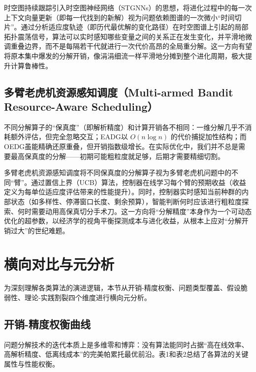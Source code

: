 时空图持续跟踪引入时空图神经网络（STGNNs）的思想，将进化过程中的每一次上下文向量更新（即每一代找到的新解）视为问题依赖图谱的一次微小“时间切片”。通过分析适应度轨迹（即历代最优解的变化路径）在时空图谱上引起的局部拓扑震荡信号，算法可以实时感知哪些变量之间的关系正在发生变化，并平滑地微调重叠边界，而不是每隔若干代就进行一次代价高昂的全局重分解。这一方向有望将原本集中爆发的分解开销，像涓涓细流一样平滑地分摊到整个进化周期，极大提升计算鲁棒性。

\subsection{多臂老虎机资源感知调度（Multi-armed Bandit Resource-Aware Scheduling）}
不同分解算子的“保真度”（即解析精度）和计算开销各不相同：一维分解几乎不消耗额外评估，但完全忽略交互；EADG以 $O(n \log n)$ 的代价捕捉加性结构；而OEDG虽能精确还原重叠，但开销指数级增长。在实际优化中，我们并不总是需要最高保真度的分解——初期可能粗粒度就足够，后期才需要精细切割。

多臂老虎机资源感知调度将不同保真度的分解算子视为多臂老虎机问题中的不同“臂”。通过置信上界（UCB）算法，控制器在线学习每个臂的预期收益（收益定义为每单位适应度评估带来的性能提升）。同时，控制器实时感知当前种群的内部状态（如多样性、停滞窗口长度、剩余预算），智能判断何时应该进行粗粒度探索、何时需要动用高保真切分手术刀。这一方向将“分解精度”本身作为一个可动态优化的超参数，以经济学的视角平衡探测成本与进化收益，从根本上应对“分解开销过大”的世纪难题。

\section{横向对比与元分析}

为深刻理解各类算法的演进逻辑，本节从开销-精度权衡、问题类型覆盖、假设脆弱性、理论-实践割裂四个维度进行横向元分析。

\subsection{开销-精度权衡曲线}
问题分解技术的迭代本质上是多维零和博弈：没有算法能同时占据“高在线效率、高解析精度、低离线成本”的完美帕累托最优前沿。表1和表2总结了各算法的关键属性与性能权衡。

